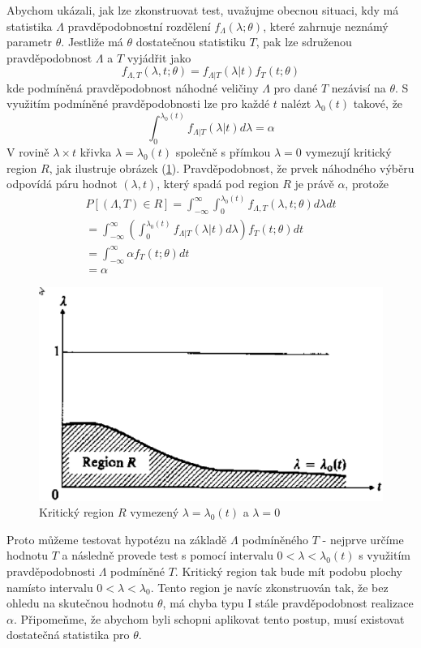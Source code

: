 Abychom ukázali, jak lze zkonstruovat test, uvažujme obecnou situaci, kdy má statistika $\Lambda$ pravděpodobnostní rozdělení $f_{\Lambda}(\lambda; \theta)$, které zahrnuje neznámý parametr $\theta$. Jestliže má $\theta$ dostatečnou statistiku $T$, pak lze sdruženou pravděpodobnost $\Lambda$ a $T$ vyjádřit jako
\begin{equation*}
f_{\Lambda, T}(\lambda, t; \theta) = f_{\Lambda|T}(\lambda|t)f_T(t; \theta)
\end{equation*}
kde podmíněná pravděpodobnost náhodné veličiny $\Lambda$ pro dané $T$ nezávisí na $\theta$. S využitím podmíněné pravděpodobnosti lze pro každé $t$ nalézt $\lambda_0(t)$ takové, že
\begin{equation*}
\int_0^{\lambda_0(t)} f_{\Lambda|T}(\lambda|t)d\lambda = \alpha
\end{equation*}
V rovině $\lambda \times t$ křivka $\lambda = \lambda_0(t)$ společně s přímkou $\lambda = 0$ vymezují kritický region $R$, jak ilustruje obrázek (\ref{critical-region-R}). Pravděpodobnost, že prvek náhodného výběru odpovídá páru hodnot $(\lambda, t)$, který spadá pod region $R$ je právě $\alpha$, protože
\begin{multline*}
P[(\Lambda, T) \in R] = \int_{-\infty}^{\infty} \int_0^{\lambda_0(t)} f_{\Lambda, T}(\lambda, t; \theta)d \lambda d t\\
= \int_{-\infty}^{\infty} \left(\int_0^{\lambda_0(t)}f_{\Lambda|T}(\lambda|t)d \lambda \right)f_T(t; \theta)dt\\
= \int_{-\infty}^{\infty}\alpha f_T(t; \theta)dt\\
= \alpha
\end{multline*}
\begin{figure}[htp]
\centering
\includegraphics[scale = 0.5]{pictures/critical_region_R.eps}
\caption{Kritický region $R$ vymezený  $\lambda = \lambda_0(t)$ a $\lambda = 0$}
\label{critical-region-R}
\end{figure}
Proto můžeme testovat hypotézu na základě $\Lambda$ podmíněného $T$ - nejprve určíme hodnotu $T$ a následně provede test s pomocí intervalu $0 < \lambda < \lambda_0(t)$ s využitím pravděpodobnosti $\Lambda$ podmíněné $T$. Kritický region tak bude mít podobu plochy namísto intervalu $0 < \lambda < \lambda_0$. Tento region je navíc zkonstruován tak, že bez ohledu na skutečnou hodnotu $\theta$, má chyba typu I stále pravděpodobnost realizace $\alpha$. Připomeňme, že abychom byli schopni aplikovat tento postup, musí existovat dostatečná statistika pro $\theta$.

